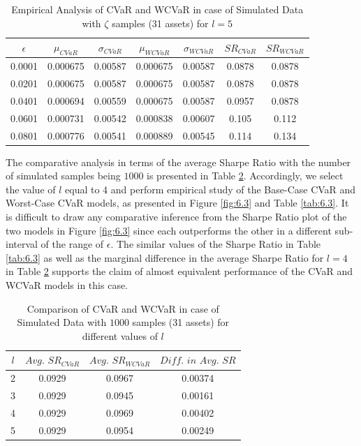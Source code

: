 \begin{table}[!h]
    \centering
    \captionsetup{justification=centering}

   \begin{tabular}{||c|c|c|c|c|c|c||}
   \hline
  
$\epsilon$ & $\mu_{CVaR}$ & $\sigma_{CVaR}$ & $\mu_{WCVaR}$ & $\sigma_{WCVaR}$ & $SR_{CVaR}$ & $SR_{WCVaR}$\\
  
  \hline
0.0001 & 0.000675 & 0.00587 & 0.000675 & 0.00587 & 0.0878 & 0.0878 \\
0.0201 & 0.000675 & 0.00587 & 0.000675 & 0.00587 & 0.0878 & 0.0878 \\
0.0401 & 0.000694 & 0.00559 & 0.000675 & 0.00587 & 0.0957 & 0.0878 \\
0.0601 & 0.000731 & 0.00542 & 0.000838 & 0.00607 & 0.105 & 0.112 \\
0.0801 & 0.000776 & 0.00541 & 0.000889 & 0.00545 & 0.114 & 0.134 \\
  \hline
\end{tabular}
    \caption{Empirical Analysis of CVaR and WCVaR in case of Simulated Data with $\zeta$ samples (31 assets) for $l=5$}
    \label{tab:6.2}
\end{table}

The comparative analysis in terms of the average Sharpe Ratio with the number of simulated samples being $1000$ is presented in Table \ref{avgtab:6.3}. Accordingly, we select the value of $l$ equal to 4 and perform empirical study of the Base-Case CVaR and Worst-Case CVaR models, as presented in Figure \ref{fig:6.3} and Table \ref{tab:6.3}. It is difficult to draw any comparative inference from the Sharpe Ratio plot of the two models in Figure \ref{fig:6.3} since each outperforms the other in a different sub-interval of the range of $\epsilon$. The similar values of the Sharpe Ratio in Table \ref{tab:6.3} as well as the marginal difference in the average Sharpe Ratio for $l=4$ in Table \ref{avgtab:6.3} supports the claim of almost equivalent performance of the CVaR and WCVaR models in this case.

\begin{table}[!h]
    \centering
    \captionsetup{justification=centering}

   \begin{tabular}{||c|c|c|c||}
   \hline
  
$l$ & $Avg. \, \, SR_{CVaR}$ & $Avg. \, \, SR_{WCVaR}$ & $Diff. \, \, in \, \, Avg. \, \, SR$ \\
  
  \hline
2 & 0.0929 & 0.0967 & 0.00374 \\
3 & 0.0929 & 0.0945 & 0.00161 \\
4 & 0.0929 & 0.0969 & 0.00402 \\
5 & 0.0929 & 0.0954 & 0.00249 \\
  \hline
\end{tabular}
    \caption{Comparison of CVaR and WCVaR in case of Simulated Data with $1000$ samples (31 assets) for different values of $l$}
    \label{avgtab:6.3}
\end{table}

